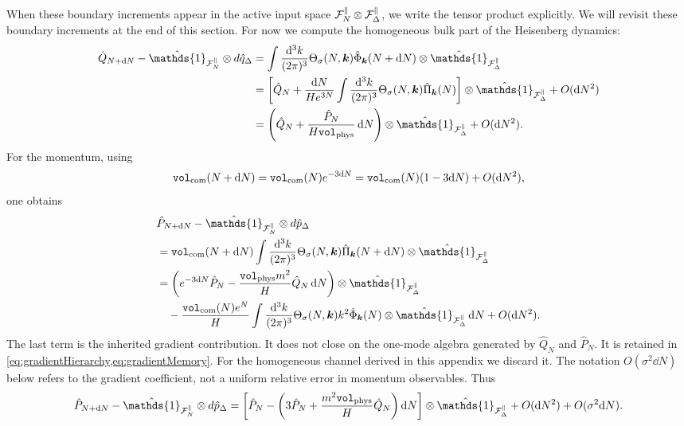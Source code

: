 \documentclass{article}
\def\cF{{\cal F}}
\newcommand{\openone}{\hat{\mathds{1}}}
\newcommand{\VF}{\mathtt{vol}_{\rm com}}
\newcommand{\Vphys}{\mathtt{vol}_{\rm phys}}
\newcommand{\hvarphi}{\hat{\Phi}}
\newcommand{\hpi}{\hat{\Pi}}
\numberwithin{equation}{section}
\begin{document}
	When these boundary increments appear in the active input space \(\cF_N^\parallel\otimes\cF_\Delta^\parallel\), we write the tensor product explicitly. We will revisit these boundary increments at the end of this section. For now we compute the homogeneous bulk part of the Heisenberg dynamics:
	\begin{align}
		\hat Q_{N+\dd N}-\openone_{\cF_N^\parallel}\otimes d\hat q_\Delta &= \int\frac{\dd^3k}{(2\pi)^3} \Theta_\sigma(N,\bm k)\hvarphi_{\bm k}(N+\dd N) \otimes \openone_{\cF_\Delta^\parallel} \nonumber\\ &= \left[ \hat Q_N + \frac{\dd N}{H e^{3N}} \int\frac{\dd^3k}{(2\pi)^3} \Theta_\sigma(N,\bm k)\hpi_{\bm k}(N) \right] \otimes \openone_{\cF_\Delta^\parallel} + O(\dd N^2) \nonumber\\ &= \left( \hat Q_N + \frac{\hat P_N}{H\Vphys}\,\dd N \right) \otimes \openone_{\cF_\Delta^\parallel} + O(\dd N^2).
		\label{eq:inputQWithIRApp}
	\end{align}
	For the momentum, using
	\begin{equation}
		\VF(N+\dd N) = \VF(N)e^{-3\dd N} = \VF(N)(1-3\dd N)+O(\dd N^2),
		\label{eq:VFexpandApp}
	\end{equation}
	one obtains
	\begin{align}
		&\hat P_{N+\dd N}-\openone_{\cF_N^\parallel}\otimes d\hat p_\Delta \nonumber\\ &= \VF(N+\dd N) \int\frac{\dd^3k}{(2\pi)^3} \Theta_\sigma(N,\bm k)\hpi_{\bm k}(N+\dd N) \otimes \openone_{\cF_\Delta^\parallel} \nonumber\\ &= \left( e^{-3\dd N}\hat P_N - \frac{\Vphys m^2}{H}\hat Q_N\,\dd N \right) \otimes \openone_{\cF_\Delta^\parallel} \nonumber\\ &\quad - \frac{\VF(N)e^N}{H} \int\frac{\dd^3k}{(2\pi)^3} \Theta_\sigma(N,\bm k)k^2\hvarphi_{\bm k}(N) \otimes \openone_{\cF_\Delta^\parallel}\,\dd N + O(\dd N^2).
		\label{eq:inputSectorWithGradientApp}
	\end{align}
	The last term is the inherited gradient contribution. It does not close on the one-mode algebra generated by \(\hat Q_N\) and \(\hat P_N\). It is retained in \cref{eq:gradientHierarchy,eq:gradientMemory}. For the homogeneous channel derived in this appendix we discard it. The notation $O(\sigma^2\dd N)$ below refers to the gradient coefficient, not a uniform relative error in momentum observables. Thus
	\begin{equation}
		\hat P_{N+\dd N}-\openone_{\cF_N^\parallel}\otimes d\hat p_\Delta = \left[ \hat P_N - \left( 3\hat P_N+\frac{m^2\Vphys}{H}\hat Q_N \right)\dd N \right] \otimes \openone_{\cF_\Delta^\parallel} + O(\dd N^2) + O(\sigma^2 \dd N).
		\label{eq:inputSectorWithIRApp}
	\end{equation}
\end{document}
